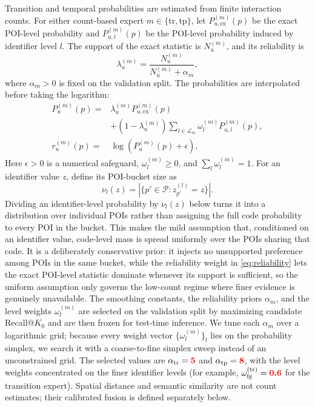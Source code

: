 \documentclass[journal]{IEEEtran}
\newcommand{\POIs}{\mathcal{P}}
\newcommand{\mock}[1]{\textbf{\textcolor{red}{#1}}}
\begin{document}
Transition and temporal probabilities are estimated from finite interaction
counts. For either count-based expert $m\in\{\mathrm{tr},\mathrm{tp}\}$, let
$P_{u,\mathrm{ex}}^{(m)}(p)$ be the exact POI-level probability and
$P_{u,l}^{(m)}(p)$ be the POI-level probability induced by identifier level
$l$. The support of the exact statistic is $N_u^{(m)}$, and its reliability is
\begin{equation}
\lambda_{u}^{(m)}
=
\frac{N_{u}^{(m)}}{N_{u}^{(m)}+\alpha_m},
\label{eq:reliability}
\end{equation}
where $\alpha_m>0$ is fixed on the validation split.
The probabilities are interpolated before taking the logarithm:
\begin{align}
P_u^{(m)}(p)
={}&
\lambda_u^{(m)}P_{u,\mathrm{ex}}^{(m)}(p)
\nonumber\\
&+
(1-\lambda_u^{(m)})
\sum_{l\in\mathcal{L}_m}
\omega_l^{(m)}P_{u,l}^{(m)}(p),
\label{eq:unified_backoff_probability}\\
r_u^{(m)}(p)
={}&
\log\!\left(P_u^{(m)}(p)+\epsilon\right),
\label{eq:unified_backoff}
\end{align}
Here $\epsilon>0$ is a numerical safeguard,
$\omega_l^{(m)}\ge0$, and $\sum_l\omega_l^{(m)}=1$.
For an identifier value $z$, define its POI-bucket size as
\begin{equation}
\nu_l(z)
=
\left|\{p'\in\POIs:z_{p'}^{(l)}=z\}\right|.
\label{eq:identifier_bucket_size}
\end{equation}
Dividing an identifier-level probability by $\nu_l(z)$ below turns it into a
distribution over individual POIs rather than assigning the full code
probability to every POI in the bucket. This makes the mild assumption that,
conditioned on an identifier value, code-level mass is spread uniformly over
the POIs sharing that code. It is a deliberately conservative prior: it injects
no unsupported preference among POIs in the same bucket, while the reliability
weight in \eqref{eq:reliability} lets the exact POI-level statistic dominate
whenever its support is sufficient, so the uniform assumption only governs the
low-count regime where finer evidence is genuinely unavailable.
The smoothing constants, the reliability priors $\alpha_m$, and the level
weights $\omega_l^{(m)}$ are selected on the validation split by maximizing
candidate Recall@$K_0$ and are then frozen for test-time inference. We tune
each $\alpha_m$ over a logarithmic grid; because every weight vector
$\{\omega_l^{(m)}\}_l$ lies on the probability simplex, we search it with a
coarse-to-fine simplex sweep instead of an unconstrained grid. The selected
values are $\alpha_{\mathrm{tr}}=\mock{5}$ and $\alpha_{\mathrm{tp}}=\mock{8}$,
with the level weights concentrated on the finer identifier levels (for
example, $\omega_{\mathrm{fg}}^{(\mathrm{tr})}=\mock{0.6}$ for the transition
expert). Spatial distance and semantic similarity are not count estimates;
their calibrated fusion is defined separately below.
\end{document}
